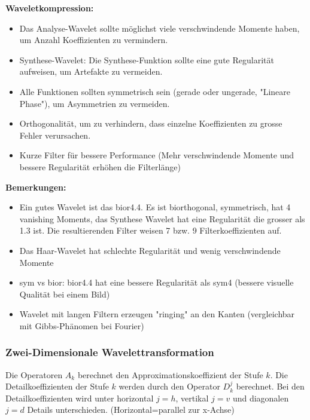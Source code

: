 \textbf{Waveletkompression:}
\begin{itemize}
	\item Das Analyse-Wavelet sollte möglichst viele verschwindende Momente haben, um Anzahl Koeffizienten zu vermindern.
	\item Synthese-Wavelet: Die Synthese-Funktion sollte eine gute Regularität aufweisen, um Artefakte zu vermeiden.
	\item Alle Funktionen sollten symmetrisch sein (gerade oder ungerade, "Lineare Phase"), um Asymmetrien zu vermeiden.
	\item Orthogonalität, um zu verhindern, dass einzelne Koeffizienten zu grosse Fehler verursachen.
	\item Kurze Filter für bessere Performance (Mehr verschwindende Momente und bessere Regularität erhöhen die Filterlänge)
\end{itemize}

\textbf{Bemerkungen:}\\
\begin{itemize}
  \item Ein gutes Wavelet ist das bior4.4. Es ist biorthogonal, symmetrisch, hat 4 vanishing Moments, das Synthese Wavelet hat eine Regularität die grosser als 1.3 ist. Die resultierenden Filter weisen 7 bzw. 9 Filterkoeffizienten auf.
  \item Das Haar-Wavelet hat schlechte Regularität und wenig verschwindende Momente
  \item sym vs bior: bior4.4 hat eine bessere Regularität als sym4 (bessere visuelle Qualität bei einem Bild)
  \item Wavelet mit langen Filtern erzeugen "ringing" an den Kanten (vergleichbar mit Gibbs-Phänomen bei Fourier)
\end{itemize}


\subsubsection{Zwei-Dimensionale Wavelettransformation }

Die Operatoren $A_k$ berechnet den Approximationskoeffizient der Stufe $k$. Die Detailkoeffizienten der Stufe $k$ werden durch den Operator $D_k^j$ berechnet. Bei den Detailkoeffizienten wird unter horizontal $j=h$, vertikal $j=v$ und diagonalen $j=d$ Details unterschieden. (Horizontal=parallel zur x-Achse)

